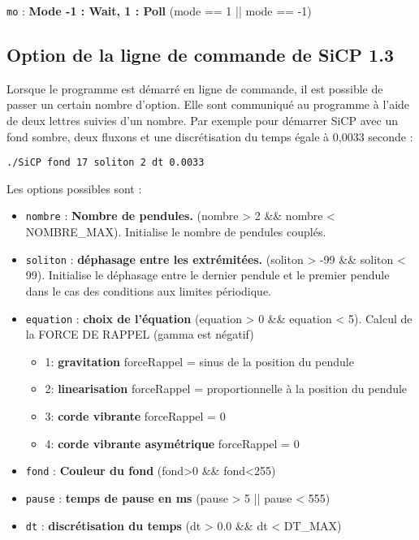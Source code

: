 \texttt{mo} : {\bf Mode -1 : Wait, 1 : Poll} %
  (mode == 1 || mode == -1)

\normalsize


\subsection{Option de la ligne de commande de SiCP 1.3}
Lorsque le programme est démarré en ligne de commande, il est possible de passer un certain nombre d'option. Elle sont communiqué au programme à l'aide de deux lettres suivies d'un nombre. Par exemple pour démarrer SiCP avec un fond sombre, deux fluxons et une discrétisation du temps égale à 0,0033 seconde :
\begin{center}
\texttt{./SiCP fond 17 soliton 2 dt 0.0033}
\end{center}
Les options possibles sont :
\begin{itemize}[leftmargin=2cm, label=, itemsep=3pt]
\item {\large \texttt{nombre}} : {\bf Nombre de pendules.} %
  (nombre > 2 \&\& nombre < NOMBRE\_MAX). Initialise le nombre de pendules couplés.
\item {\large \texttt{soliton}} : {\bf déphasage entre les extrémitées.} %
  (soliton > -99 \&\& soliton < 99). Initialise le déphasage entre le dernier pendule et le premier pendule dans le cas des conditions aux limites périodique.
\item {\large \texttt{equation}} : {\bf choix de l'équation} %
  (equation > 0 \&\& equation < 5).  Calcul de la FORCE DE RAPPEL (gamma est négatif)
\begin{itemize}[leftmargin=1cm, label=, itemsep=0pt]
\item 1: {\bf gravitation} forceRappel = sinus de la position du pendule
\item 2: {\bf linearisation} forceRappel = proportionnelle à la position du pendule
\item 3: {\bf corde vibrante} forceRappel = 0
\item 4: {\bf corde vibrante asymétrique} forceRappel = 0
\end{itemize}
\item {\large \texttt{fond}} : {\bf Couleur du fond} %
  (fond>0 \&\& fond<255)
\item {\large \texttt{pause}} : {\bf temps de pause en ms} %
  (pause > 5 || pause < 555)
\item {\large \texttt{dt}} : {\bf discrétisation du temps} %
  (dt > 0.0 \&\& dt < DT\_MAX)
\end{itemize}

